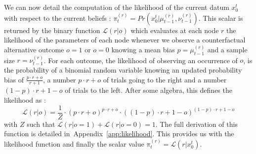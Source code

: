 \documentclass[10pt,letterpaper]{article}
\newcommand{\eq}[1]{\begin{equation*}#1\end{equation*}}
\newcommand{\eql}[1]{\begin{equation}#1\end{equation}}
\newcommand{\Ll}{\mathcal{L}}
\newcommand{\seeApp}[1]{Appendix~\ref{app:#1}}
\begin{document}
We can now detail the computation of the likelihood of the current datum $x_0^{t}$ with respect to
the current beliefs : $\pi^{(r)}_t = Pr( x_0^{t} |  \mu^{(r)}_{t-1}, \nu^{(r)}_{t-1})$. %
This scalar is returned by the binary function
$\Ll(r | o)$ which evaluates at each node $r$ the likelihood of the parameters of each node
whenever we observe a counterfactual alternative outcome $o=1$ or $o=0$
knowing a mean bias $p=\mu^{(r)}_{t-1}$
and a sample size $r=\nu^{(r)}_{t-1}$.
For each outcome, the likelihood of observing an occurrence of $o$,
is the probability of a binomial random variable knowing
an updated probability bias of $\frac{p \cdot r + o}{r+1}$,
a number $p \cdot r + o$ of trials going to the right and
a number $(1-p) \cdot r + 1 - o$ of trials to the left.
After some algebra, this defines the likelihood as :
\eql{
\Ll(r | o) = \frac{1}{Z} \cdot {(p \cdot r + o)}^{p \cdot r + o} \cdot {((1- p)\cdot r + 1- o)}^{(1- p)\cdot r + 1- o}
\label{eq:likelihood}
}
with $Z$ such that $\Ll(r | o=1) + \Ll(r | o=0)=1$. %
The full derivation of this function is detailed in~\seeApp{likelihood}.
This provides us with the likelihood function
and finally the scalar value $\pi^{(r)}_t = \Ll(r | x_0^{t})$.
\end{document}
